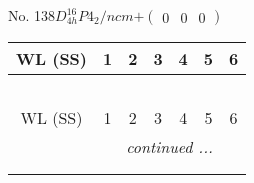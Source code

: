\documentclass[fleqn,9pt,landscape]{jsarticle}
\begin{document}
\newpage
No. 138\quad$D_{4h}^{16}$\quad$P4_2/ncm$\quad[ tetragonal ]\quad$+\begin{pmatrix} 0 & 0 & 0 \end{pmatrix}$
\begin{center}
\renewcommand{\arraystretch}{1.2}
\begin{longtable}{ccccccc}
 \hline \hline
WL (SS) & 1 & 2 & 3 & 4 & 5 & 6 \\ \hline \endfirsthead

\multicolumn{6}{l}{\tablename\ \thetable{}} \\
 \hline \hline
WL (SS) & 1 & 2 & 3 & 4 & 5 & 6 \\ \hline \endhead

 \hline \hline
\multicolumn{6}{r}{\footnotesize\it continued ...} \\ \endfoot

 \hline \hline
\multicolumn{6}{r}{} \\ \endlastfoot


\end{longtable}
\end{center}
\end{document}
